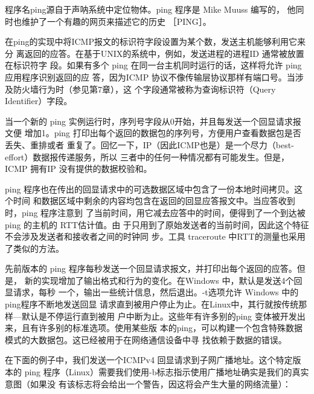 \begin{tcolorbox}
	程序名ping源自于声呐系统中定位物体。ping 程序是 Mike Muuss 编写的，
	他同时也维护了一个有趣的网页来描述它的历史 ［PING］。
\end{tcolorbox}

在ping的实现中将ICMP报文的标识符字段设置为某个数，发送主机能够利用它来分
离返回的应答。在基于UNIX的系统中，例如，发送进程的进程ID 通常被放置在标识符字
段。如果有多个 ping 在同一台主机同时运行的话，这样将允许 ping 应用程序识别返回的应
答，因为ICMP 协议不像传输层协议那样有端口号。当涉及防火墙行为时（参见第7章），这
个字段通常被称为查询标识符（Query Identifier）字段。

当一个新的 ping 实例运行时，序列号字段从0开始，并且每发送一个回显请求报文便
增加1。ping 打印出每个返回的数据包的序列号，方便用户查看数据包是否丢失、重排或者
重复了。回忆一下，IP（因此ICMP也是）是一个尽力（best-effort）数据报传递服务，所以
三者中的任何一种情况都有可能发生。但是，ICMP 拥有IP 没有提供的数据校验和。

ping 程序也在传出的回显请求中的可选数据区域中包含了一份本地时间拷贝。这个时间
和数据区域中剩余的内容均包含在返回的回显应答报文中。当应答收到时，ping 程序注意到
了当前时间，用它减去应答中的时间，便得到了一个到达被 ping 的主机的 RTT估计值。由
于只用到了原始发送者的当前时间，因此这个特征不会涉及发送者和接收者之间的时钟同
步。工具 traceroute 中RTT的测量也采用了类似的方法。

先前版本的 ping 程序每秒发送一个回显请求报文，并打印出每个返回的应答。但是，
新的实现增加了输出格式和行为的变化。在Windows 中，默认是发送4个回显请求，每秒
一个，输出一些统计信息，然后退出。-t选项允许 Windows 中的ping程序不断地发送回显
请求直到被用户停止为止。在Linux中，其行就按传统那样—默认是不停运行直到被用
户中断为止。这些年有许多别的ping 变体被开发出来，且有许多别的标准选项。使用某些版
本的ping，可以构建一个包含特殊数据模式的大数据包。这已经被用于在网络通信设备中寻
找依赖于数据的错误。

在下面的例子中，我们发送一个ICMPv4 回显请求到子网广播地址。这个特定版本的
ping 程序（Linux）需要我们使用-b标志指示使用广播地址确实是我们的真实意图（如果没
有该标志将会给出一个警告，因这将会产生大量的网络流量）：

